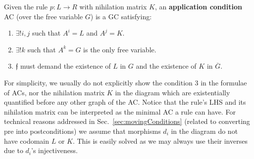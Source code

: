 \documentclass{fundam}
\begin{document}
Given the rule $p:L \rightarrow R$ with nihilation matrix $K$, an
\textbf{application condition} AC (over the free variable $G$) is a
GC satisfying:
\begin{enumerate}
\item $\exists ! i,j$ such that $A^i = L$ and $A^j = K$.
\item $\exists ! k$ such that $A^k = G$ is the only free variable.
\item $\mathfrak{f}$ must demand the existence of $L$ in $G$ and the
  existence of $K$ in $\overline{G}$.
\end{enumerate}

For simplicity, we usually do not explicitly show the condition 3 in
the formulae of ACs, nor the nihilation matrix $K$ in the diagram
which are existentially quantified before any other graph of the
AC. Notice that the rule's LHS and its nihilation matrix can be
interpreted as the minimal AC a rule can have. For technical reasons
addressed in Sec.~\ref{sec:movingConditions} (related to converting
pre into postconditions) we assume that morphisms $d_i$ in the diagram
do not have codomain $L$ or $K$. This is easily solved as we may
always use their inverses due to $d_i$'s injectiveness.
\end{document}
